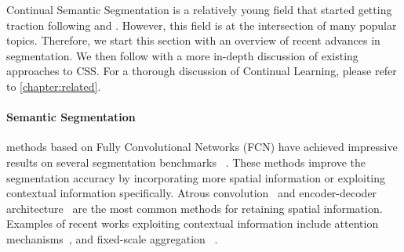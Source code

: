 Continual Semantic Segmentation is a relatively young field that started getting traction following
\citet{michieli2019ilt} and \citet{cermelli2020modelingthebackground}. However, this field is at the
intersection of many popular topics. Therefore, we start this section with an overview of recent
advances in segmentation. We then follow with a more in-depth discussion of existing approaches to
\ac{CSS}. For a thorough discussion of Continual Learning, please refer to
\autoref{chapter:related}.

\paragraph{Semantic Segmentation} methods based on Fully Convolutional Networks (FCN)
\citep{long2015fcn,sermanet2014overfeat} have achieved impressive results on several segmentation
benchmarks ~\citep{everingham2015pascalvoc,
    cordts2016cityscapes,zhou2017adedataset,caesar2018cocoostuff}. These methods improve the
segmentation accuracy by incorporating more spatial information or exploiting contextual information
specifically. Atrous convolution~\citep{chen2018deeplab,mehta2018espnet} and encoder-decoder
architecture~\citep{ronneberger2015UNet,noh2015deconvolution,badrinarayanan2017segnet} are the most
common methods for retaining spatial information. Examples of recent works exploiting contextual
information include attention
mechanisms~\citep{yuan2018ocnet,zhao2018psanet,fu2019DANet,huang2019CCNet,yuan2020ocr,tao2020HRNet,zhang2020resnest},
and fixed-scale aggregation
~\citep{zhao2017PSPNet,chen2018deeplab,chen2018ZPSA,zhang2018ContextEncoding}.

